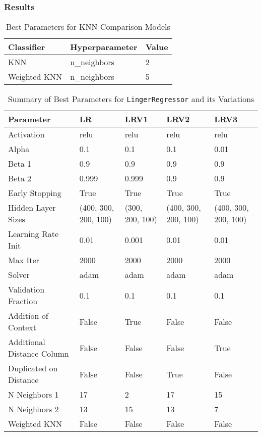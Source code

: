 \documentclass[a4paper, 12pt]{report}
\begin{document}
\subsubsection{Results}


\begin{table}[H]
    \centering
    \caption{Best Parameters for KNN Comparison Models}
    \label{tab:best_parameters_combined_knn_exp2}
    \begin{tabular}{|l|l|l|}
    \toprule
    \textbf{Classifier} & \textbf{Hyperparameter} & \textbf{Value} \\
    \midrule
    KNN & n\_neighbors & 2 \\
    Weighted KNN & n\_neighbors & 5 \\
    \bottomrule
\end{tabular}
\end{table}

\begin{table}[H]
    \centering
    \caption{Summary of Best Parameters for \texttt{LingerRegressor} and its Variations}
    \label{tab:best_parameters_summary_exp1}
    \footnotesize
    \begin{tabular}{|l|l|l|l|l|}
    \hline
    \textbf{Parameter} & \textbf{LR} & \textbf{LRV1} & \textbf{LRV2} & \textbf{LRV3} \\
    \hline
    Activation & relu & relu & relu & relu \\
    Alpha & 0.1 & 0.1 & 0.1 & 0.01 \\
    Beta 1 & 0.9 & 0.9 & 0.9 & 0.9 \\
    Beta 2 & 0.999 & 0.999 & 0.9 & 0.9 \\
    Early Stopping & True & True & True & True \\
    Hidden Layer Sizes & (400, 300, 200, 100) & (300, 200, 100) & (400, 300, 200, 100) & (400, 300, 200, 100) \\
    Learning Rate Init & 0.01 & 0.001 & 0.01 & 0.01 \\
    Max Iter & 2000 & 2000 & 2000 & 2000 \\
    Solver & adam & adam & adam & adam \\
    Validation Fraction & 0.1 & 0.1 & 0.1 & 0.1 \\
    Addition of Context & False & True & False & False \\
    Additional Distance Column & False & False & False & True \\
    Duplicated on Distance & False & False & True & False \\
    N Neighbors 1 & 17 & 2 & 17 & 15 \\
    N Neighbors 2 & 13 & 15 & 13 & 7 \\
    Weighted KNN & False & False & False & False \\
    \hline
    \end{tabular}
\end{table}
\clearpage
\end{document}
